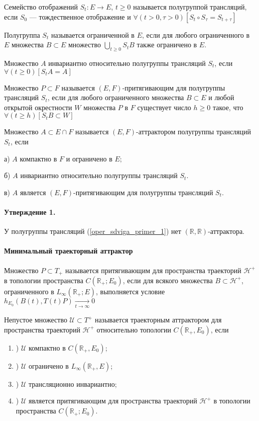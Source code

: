 \opred
Семейство отображений $S_t : E \to E$, $t \geq 0$ называется полугруппой трансляций,
если $S_0$ --- тождественное отображение и
$
	\forall(t>0,\tau>0)[S_t \circ S_\tau = S_{t+\tau}]
$

\opred
Полугруппа $S_t$ называется ограниченной в $E$, если для любого ограниченного в $E$ множества
$B \subset E$ множество $\bigcup\limits_{t\geq0}S_t B$ также ограничено в $E$.

\opred

Множество $A$ инвариантно относительно полугруппы трансляций $S_t$, если
$
	\forall(t\geq 0)[S_t A = A]
$

\opred

Множество $P \subset F$ называется $(E,F)$-притягивающим для полугруппы трансляций $S_t$,
если для любого ограниченного множества $B \subset E$ и любой открытой окрестности $W$ множества $P$ в $F$ существует
число $h\geq 0$ такое, что
$
	\forall(t \geq h)[S_t B \subset W]
$


\opred

Множество $A\subset E\cap F$ называется $(E,F)$-аттрактором полугруппы трансляций $S_t$, если

а) $A$ компактно в $F$ и ограничено в $E$;

б) $A$ инвариантно относительно полугруппы трансляций $S_t$.

в) $A$ является $(E,F)$-притягивающим для полугруппы трансляций $S_t$.

\paragraph{Утверждение 1.}
У полугруппы трансляций (\ref{oper_sdviga_primer_1}) нет $(\mathbb{R},\mathbb{R})$-аттрактора.

\paragraph{Минимальный траекторный аттрактор}

\opred

Множество $P \subset T_+$ называется притягивающим для пространства траекторий $\mathcal{H}^+$
в топологии пространства $C(\mathbb{R}_+; E_0)$,
если для всякого множества $B \subset \mathcal{H}^+$, ограниченного в $L_{\infty}(\mathbb{R}_+;E)$, выполняется условие
$
	h_{E_0}(B(t),T(t)P) \xrightarrow[t\to\infty]{}0
$

\opred

Непустое множество $\mathcal{U}\subset T^+$
называется траекторным аттрактором для пространства траекторий $\mathcal{H}^+$
относительно топологии $C(\mathbb{R}_+,E_0)$, если
\begin{enumerate}
	\item)
		$\mathcal{U}$ компактно в $C(\mathbb{R}_+,E_0)$;
	\item)
		$\mathcal{U}$ ограничено в $L_{\infty}(\mathbb{R}_+,E)$;
	\item)
		$\mathcal{U}$ трансляционно инвариантно;
	\item)
		$\mathcal{U}$ является притягивающим для пространства траекторий $\mathcal{H}^+$
		в топологии пространства $C(\mathbb{R}_+; E_0)$.
\end{enumerate}

